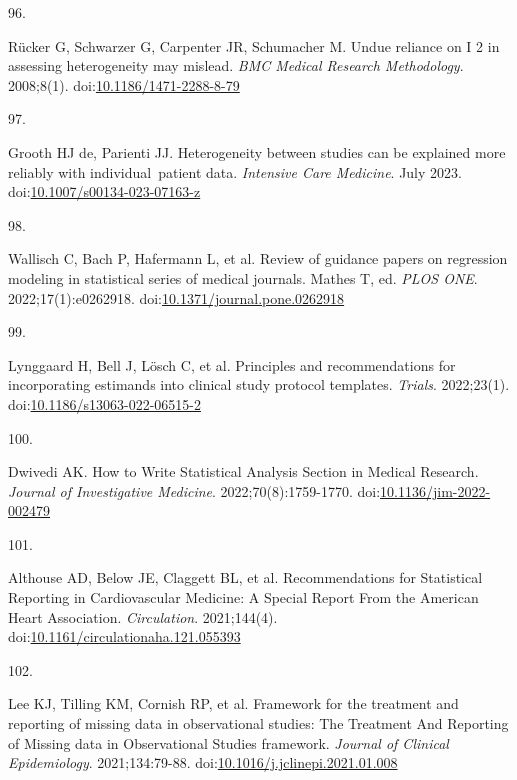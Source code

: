 \documentclass[
]{book}
\newlength{\cslhangindent}
\newlength{\csllabelwidth}
\newlength{\cslentryspacingunit} %
\newenvironment{CSLReferences}[2] %
 {%
  \setlength{\parindent}{0pt}
  \ifodd #1
  \let\oldpar\par
  \def\par{\hangindent=\cslhangindent\oldpar}
  \fi
  \setlength{\parskip}{#2\cslentryspacingunit}
 }%
 {}
\newcommand{\CSLLeftMargin}[1]{\parbox[t]{\csllabelwidth}{#1}}
\newcommand{\CSLRightInline}[1]{\parbox[t]{\linewidth - \csllabelwidth}{#1}\break}
\begin{document}
\begin{CSLReferences}{0}{0}
\leavevmode{}%
\CSLLeftMargin{96. }%
\CSLRightInline{Rücker G, Schwarzer G, Carpenter JR, Schumacher M. Undue reliance on I 2 in assessing heterogeneity may mislead. \emph{BMC Medical Research Methodology}. 2008;8(1). doi:\href{https://doi.org/10.1186/1471-2288-8-79}{10.1186/1471-2288-8-79}}

\leavevmode{}%
\CSLLeftMargin{97. }%
\CSLRightInline{Grooth HJ de, Parienti JJ. Heterogeneity between studies can be explained more reliably with individual~patient data. \emph{Intensive Care Medicine}. July 2023. doi:\href{https://doi.org/10.1007/s00134-023-07163-z}{10.1007/s00134-023-07163-z}}

\leavevmode{}%
\CSLLeftMargin{98. }%
\CSLRightInline{Wallisch C, Bach P, Hafermann L, et al. Review of guidance papers on regression modeling in statistical series of medical journals. Mathes T, ed. \emph{PLOS ONE}. 2022;17(1):e0262918. doi:\href{https://doi.org/10.1371/journal.pone.0262918}{10.1371/journal.pone.0262918}}

\leavevmode{}%
\CSLLeftMargin{99. }%
\CSLRightInline{Lynggaard H, Bell J, Lösch C, et al. Principles and recommendations for incorporating estimands into clinical study protocol templates. \emph{Trials}. 2022;23(1). doi:\href{https://doi.org/10.1186/s13063-022-06515-2}{10.1186/s13063-022-06515-2}}

\leavevmode{}%
\CSLLeftMargin{100. }%
\CSLRightInline{Dwivedi AK. How to Write Statistical Analysis Section in Medical Research. \emph{Journal of Investigative Medicine}. 2022;70(8):1759-1770. doi:\href{https://doi.org/10.1136/jim-2022-002479}{10.1136/jim-2022-002479}}

\leavevmode{}%
\CSLLeftMargin{101. }%
\CSLRightInline{Althouse AD, Below JE, Claggett BL, et al. Recommendations for Statistical Reporting in Cardiovascular Medicine: A Special Report From the American Heart Association. \emph{Circulation}. 2021;144(4). doi:\href{https://doi.org/10.1161/circulationaha.121.055393}{10.1161/circulationaha.121.055393}}

\leavevmode{}%
\CSLLeftMargin{102. }%
\CSLRightInline{Lee KJ, Tilling KM, Cornish RP, et al. Framework for the treatment and reporting of missing data in observational studies: The Treatment And Reporting of Missing data in Observational Studies framework. \emph{Journal of Clinical Epidemiology}. 2021;134:79-88. doi:\href{https://doi.org/10.1016/j.jclinepi.2021.01.008}{10.1016/j.jclinepi.2021.01.008}}


\end{CSLReferences}
\end{document}
